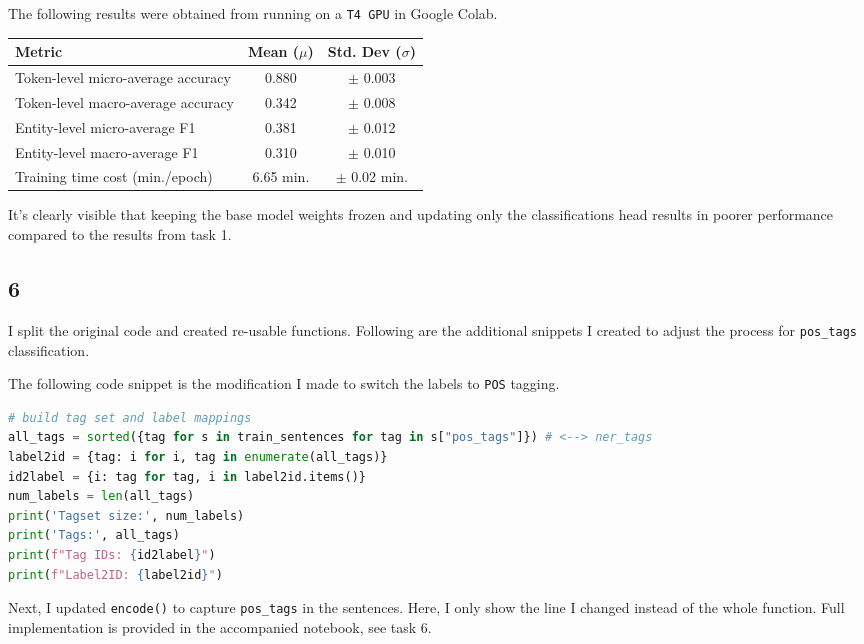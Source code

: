 \documentclass[12pt,a4paper]{report}%
\begin{document}
The following results were obtained from running on a \lstinline{T4 GPU} in Google Colab.

\begin{table}[h]
\centering
\begin{tabular}{|p{6cm}|c|c|}
\hline
\textbf{Metric} & \textbf{Mean ($\mu$)} & \textbf{Std. Dev ($\sigma$)} \\ \hline
Token-level micro-average accuracy & 0.880 & $\pm$ 0.003 \\ \hline
Token-level macro-average accuracy & 0.342 & $\pm$ 0.008 \\ \hline
Entity-level micro-average F1      & 0.381 & $\pm$ 0.012 \\ \hline
Entity-level macro-average F1      & 0.310 & $\pm$ 0.010 \\ \hline
Training time cost (min./epoch)         & 6.65 min. & $\pm$ 0.02 min. \\ \hline
\end{tabular}
\end{table}

It's clearly visible that keeping the base model weights frozen and updating only the classifications head results in poorer performance compared to the results from task 1.


\subsection*{6}

I split the original code and created re-usable functions. Following are the additional snippets I created to adjust the process for \lstinline{pos_tags} classification.

The following code snippet is the modification I made to switch the labels to \lstinline{POS} tagging.

\begin{lstlisting}[language=Python]
# build tag set and label mappings
all_tags = sorted({tag for s in train_sentences for tag in s["pos_tags"]}) # <--> ner_tags
label2id = {tag: i for i, tag in enumerate(all_tags)}
id2label = {i: tag for tag, i in label2id.items()}
num_labels = len(all_tags)
print('Tagset size:', num_labels)
print('Tags:', all_tags)
print(f"Tag IDs: {id2label}")
print(f"Label2ID: {label2id}")
\end{lstlisting}

Next, I updated \lstinline{encode()} to capture \lstinline{pos_tags} in the sentences. Here, I only show the line I changed instead of the whole function. Full implementation is provided in the accompanied notebook, see task 6.
\end{document}
